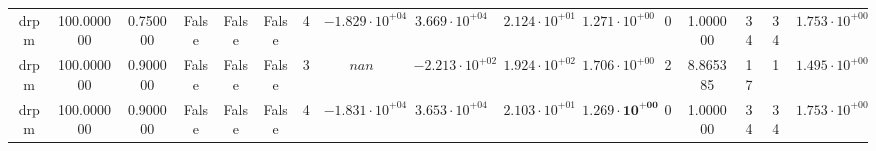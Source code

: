 \begin{table}
\begin{tabular}{cccccccccccccccc}
drpm & 100.000000 & 0.750000 & False & False & False & 4 & $-1.829 \cdot 10^{+04}$ & $3.669 \cdot 10^{+04}$ & $2.124 \cdot 10^{+01}$ & $1.271 \cdot 10^{+00}$ & 0 & 1.000000 & 34 & 34 & $1.753 \cdot 10^{+00}$ \\
drpm & 100.000000 & 0.900000 & False & False & False & 3 & $nan$ & $-2.213 \cdot 10^{+02}$ & $1.924 \cdot 10^{+02}$ & $1.706 \cdot 10^{+00}$ & 2 & 8.865385 & 17 & 1 & $1.495 \cdot 10^{+00}$ \\
drpm & 100.000000 & 0.900000 & False & False & False & 4 & $-1.831 \cdot 10^{+04}$ & $3.653 \cdot 10^{+04}$ & $2.103 \cdot 10^{+01}$ & $\mathbf{1.269 \cdot 10^{+00}}$ & 0 & 1.000000 & 34 & 34 & $1.753 \cdot 10^{+00}$ \\
\bottomrule
\end{tabular}
\end{table}
